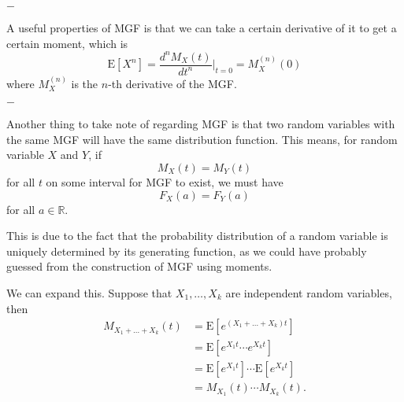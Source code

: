 \documentclass[11pt, a4paper, oneside]{book}
\theoremstyle{definition}
\newcommand{\E}[1]{\text{E}[#1]}
\def\R{\mathbb{R}}
\newcommand{\breaking}{%
    \begin{center}
    $-$
    \end{center}%
}
\begin{document}
\breaking

\noindent A useful properties of MGF is that we can take a certain derivative of it to get a certain moment, which is\[
\E{X^n} = \frac{d^n M_X(t)}{dt^n}\Bigr|_{t=0} = M^{(n)}_X(0)
\]
where $M^{(n)}_X$ is the $n$-th derivative of the MGF. 

\breaking 

\noindent Another thing to take note of regarding MGF is that two random variables with the same MGF will have the same distribution function. This means, for random variable $X$ and $Y$, if \[
M_X(t) = M_Y(t)
\]
for all $t$ on some interval for MGF to exist, we must have \[
F_X(a) = F_Y(a)
\]
for all $a \in \R$. 

\noindent This is due to the fact that the probability distribution of a random variable is uniquely determined by its generating function, as we could have probably guessed from the construction of MGF using moments.

\noindent We can expand this. Suppose that $X_1, \dots, X_k$ are independent random variables, then 
\begin{equation*}
\begin{split}
M_{X_1 + \dots + X_k}(t) &= \E{e^{(X_1 + \dots + X_k)t}} \\
&= \E{e^{X_1 t}\cdots e^{X_k t}} \\
&= \E{e^{X_1 t}}\cdots \E{e^{X_k t}} \\
&= M_{X_1}(t) \cdots M_{X_k}(t). \\
\end{split}
\end{equation*}
\end{document}
